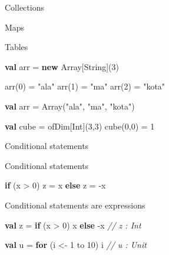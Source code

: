\documentclass[ignorenonframetext,]{beamer}
\newenvironment{Shaded}{\begin{snugshade}}{\end{snugshade}}
\newcommand{\KeywordTok}[1]{\textcolor[rgb]{0.13,0.29,0.53}{\textbf{#1}}}
\newcommand{\DecValTok}[1]{\textcolor[rgb]{0.00,0.00,0.81}{#1}}
\newcommand{\StringTok}[1]{\textcolor[rgb]{0.31,0.60,0.02}{#1}}
\newcommand{\CommentTok}[1]{\textcolor[rgb]{0.56,0.35,0.01}{\textit{#1}}}
\newcommand{\FunctionTok}[1]{\textcolor[rgb]{0.00,0.00,0.00}{#1}}
\newcommand{\NormalTok}[1]{#1}
\begin{document}
\begin{frame}[fragile]{Collections}
\begin{block}{Maps}
\end{block}

\begin{block}{Tables}

\begin{Shaded}
\begin{Highlighting}[]
\KeywordTok{val}\NormalTok{ arr = }\KeywordTok{new}\NormalTok{ Array[String](}\DecValTok{3}\NormalTok{)}

\FunctionTok{arr}\NormalTok{(}\DecValTok{0}\NormalTok{) = }\StringTok{"ala"}
\FunctionTok{arr}\NormalTok{(}\DecValTok{1}\NormalTok{) = }\StringTok{"ma"}
\FunctionTok{arr}\NormalTok{(}\DecValTok{2}\NormalTok{) = }\StringTok{"kota"}

\KeywordTok{val}\NormalTok{ arr = Array(}\StringTok{"ala"}\NormalTok{, }\StringTok{"ma"}\NormalTok{, }\StringTok{"kota"}\NormalTok{)}

\KeywordTok{val}\NormalTok{ cube = ofDim[Int](}\DecValTok{3}\NormalTok{,}\DecValTok{3}\NormalTok{)}
\FunctionTok{cube}\NormalTok{(}\DecValTok{0}\NormalTok{,}\DecValTok{0}\NormalTok{) = }\DecValTok{1}
\end{Highlighting}
\end{Shaded}

\end{block}

\end{frame}

\begin{frame}[fragile]{Conditional statements}

\begin{block}{Conditional statements}

\begin{Shaded}
\begin{Highlighting}[]
\KeywordTok{if}\NormalTok{ (x > }\DecValTok{0}\NormalTok{)}
\NormalTok{    z = x}
\KeywordTok{else}
\NormalTok{    z = -x}
\end{Highlighting}
\end{Shaded}

\end{block}

\begin{block}{Conditional statements are expressions}

\begin{Shaded}
\begin{Highlighting}[]
\KeywordTok{val}\NormalTok{ z = }\KeywordTok{if}\NormalTok{ (x > }\DecValTok{0}\NormalTok{) x }\KeywordTok{else}\NormalTok{ -x    }\CommentTok{// z : Int}

\KeywordTok{val}\NormalTok{ u = }\KeywordTok{for}\NormalTok{ (i <- }\DecValTok{1}\NormalTok{ to }\DecValTok{10}\NormalTok{) i    }\CommentTok{// u : Unit}
\end{Highlighting}
\end{Shaded}

\end{block}

\end{frame}
\end{document}

